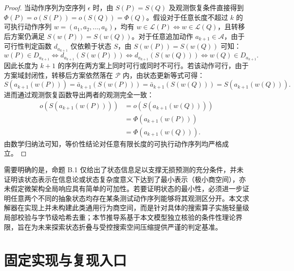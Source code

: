 \documentclass[anonymous,notoc]{gmcm2026}
\begin{document}
\begin{proof} 当动作序列为空序列 \(\epsilon\) 时，由 \(S(P) = S(Q)\) 及观测恢复条件直接得到 \(\Phi(P) = o(S(P)) = o(S(Q)) = \Phi(Q)\)。假设对于任意长度不超过 \(k\) 的可执行动作序列 \(w = (a_1, a_2, \dots, a_k)\)，均有 \(w \in \mathcal{L}(P) \iff w \in \mathcal{L}(Q)\)，且转移后方案仍满足 \(S(w(P)) = S(w(Q))\)。对于任意追加动作 \(a_{k+1} \in \mathcal{A}\)，由于可行性判定函数 \(d_{a_{k+1}}\) 仅依赖于状态 \(S\)，由 \(S(w(P)) = S(w(Q))\) 可知： \begin{equation}
w(P) \in D_{a_{k+1}} \iff d_{a_{k+1}}(S(w(P))) \iff d_{a_{k+1}}(S(w(Q))) \iff w(Q) \in D_{a_{k+1}}.
\end{equation} 因此长度为 \(k+1\) 的序列在两方案上同时可行或同时不可行。若该动作可行，由于方案域封闭性，转移后方案依然落在 \(\mathcal{P}\) 内，由状态更新等式可得： \begin{equation}
S(a_{k+1}(w(P))) = \bar{a}_{k+1}(S(w(P))) = \bar{a}_{k+1}(S(w(Q))) = S(a_{k+1}(w(Q))).
\end{equation} 进而通过观测恢复函数导出两者的观测完全一致： \begin{equation}
\begin{aligned}
o(S(a_{k+1}(w(P)))) &= o(S(a_{k+1}(w(Q)))) \\
&= \Phi(a_{k+1}(w(P))) \\
&= \Phi(a_{k+1}(w(Q))).
\end{aligned}
\end{equation} 由数学归纳法可知，等价性结论对任意有限长度的可执行动作序列均严格成立。 \end{proof}

需要明确的是，命题 B.1 仅给出了状态信息足以支撑无损预测的充分条件，并未证明该状态表示在信息论或状态复杂度意义下达到了最小表示（极小商空间），亦未假定微架构全局响应具有简单的可加性。若要证明状态的最小性，必须进一步证明任意两个不同的抽象状态均存在某条测试动作序列能够将其观测区分开。本文求解器在实现上并未构建此类通用行为商空间，而是针对具体的搜索算子实施轻量级局部校验与字节级哈希去重；本节推导系基于本文模型独立核验的条件性理论界限，旨在为未来探索状态折叠与受控搜索空间压缩提供严谨的判定基准。

\section{固定实现与复现入口}
\end{document}
